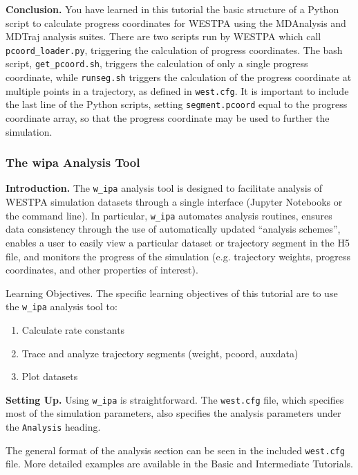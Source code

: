 \documentclass[9pt,tutorial,ASAPversion]{livecoms}
\begin{document}
\textbf{Conclusion.} You have learned in this tutorial the basic structure of a Python script to calculate progress coordinates for WESTPA using the MDAnalysis and MDTraj analysis suites. 
There are two scripts run by WESTPA which call \verb|pcoord_loader.py|, triggering the calculation of progress coordinates. 
The bash script, \verb|get_pcoord.sh|, triggers the calculation of only a single progress coordinate, while \verb|runseg.sh| triggers the calculation of the progress coordinate at multiple points in a trajectory, as defined in \verb|west.cfg|. 
It is important to include the last line of the Python scripts, setting \verb|segment.pcoord| equal to the progress coordinate array, so that the progress coordinate may be used to further the simulation.

\subsubsection{The w\textunderscore ipa Analysis Tool}

\textbf{Introduction.} The \verb|w_ipa| analysis tool is designed to facilitate analysis of WESTPA simulation datasets through a single interface (Jupyter Notebooks or the command line). 
In particular, \verb|w_ipa| automates analysis routines, ensures data consistency through the use of automatically updated “analysis schemes”, enables a user to easily view a particular dataset or trajectory segment in the H5 file, and monitors the progress of the simulation (e.g. trajectory weights, progress coordinates, and other properties of interest).  

Learning Objectives. The specific learning objectives of this tutorial are to use the \verb|w_ipa| analysis tool to:
\begin{enumerate} 
\item Calculate rate constants
\item Trace and analyze trajectory segments (weight, pcoord, auxdata)
\item Plot datasets
\end{enumerate}

\textbf{Setting Up.}  Using \verb|w_ipa| is straightforward. 
The \verb|west.cfg| file, which specifies most of the simulation parameters, also specifies the analysis parameters under the \verb|Analysis| heading.

The general format of the analysis section can be seen in the included \verb|west.cfg| file. 
More detailed examples are available in the Basic and Intermediate Tutorials.
\end{document}
